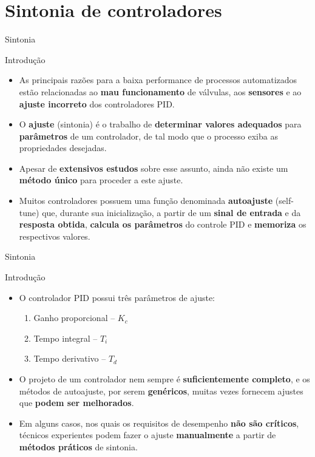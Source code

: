 \section{Sintonia de controladores}


\begin{frame}{Sintonia}
	\begin{block}{Introdução}
		\begin{itemize}
			\item As principais razões para a baixa performance de processos automatizados estão relacionadas ao \textbf{mau funcionamento} de válvulas, aos \textbf{sensores} e ao \textbf{ajuste incorreto} dos controladores PID.
			\item O \textbf{ajuste} (sintonia) é o trabalho de \textbf{determinar valores adequados} para \textbf{parâmetros} de um controlador, de tal modo que o processo exiba as propriedades desejadas.
			\item Apesar de \textbf{extensivos estudos} sobre esse assunto, ainda não existe um \textbf{método único} para proceder a este ajuste.
			\item Muitos controladores possuem uma função denominada \textbf{autoajuste} (self-tune) que, durante sua inicialização, a partir de um \textbf{sinal de entrada} e da \textbf{resposta obtida}, \textbf{calcula os parâmetros} do controle PID e \textbf{memoriza} os respectivos valores.
		\end{itemize}
	\end{block}
\end{frame}


\begin{frame}{Sintonia}
	\begin{block}{Introdução}
		\begin{itemize}
			\item O controlador PID possui três parâmetros de ajuste:
			\begin{enumerate}
				\item\normalsize Ganho proporcional – $ K_c $
				\item\normalsize Tempo integral – $ T_i $
				\item\normalsize Tempo derivativo – $ T_d $ 
			\end{enumerate}
			\item O projeto de um controlador nem sempre é \textbf{suficientemente completo}, e os métodos de autoajuste, por serem \textbf{genéricos}, muitas vezes fornecem ajustes que \textbf{podem ser melhorados}.
			\item Em alguns casos, nos quais os requisitos de desempenho \textbf{não são críticos}, técnicos experientes podem fazer o ajuste \textbf{manualmente} a partir de \textbf{métodos práticos} de sintonia.
		\end{itemize}
	\end{block}
\end{frame}


